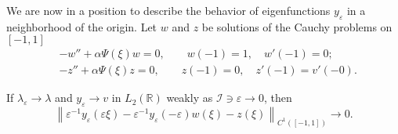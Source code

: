 \documentclass[11pt,english]{amsart}
\begin{document}
We are now in a position to describe the behavior of  eigenfunctions $y_\varepsilon$ in a neighborhood of the origin. Let $w$ and $z$ be solutions of the Cauchy problems on $[-1,1]$
\begin{align}\label{CauchyProblemW}
   & -w''+\alpha\Psi(\xi) w=0,\qquad w(-1)=1, \quad  w'(-1)=0;\\ \label{CauchyProblemZ}
   & -z''+\alpha\Psi(\xi) z=0,\qquad     z(-1)=0,\quad     z'(-1)=v'(-0).
\end{align}

\begin{g_lemma}\label{LemmaLocalConvergence} If $\lambda_\varepsilon\to \lambda$ and $y_\varepsilon \to v$ in $L_2(\mathbb{R})$ weakly as $\mathcal{I}\ni \varepsilon\to 0$, then
  \begin{equation}\label{YeWZ}
  \left\|\varepsilon^{-1}y_\varepsilon(\varepsilon\xi)-\varepsilon^{-1}y_\varepsilon(-\varepsilon)w(\xi)- z(\xi)\right\|_{C^1([-1,1])}\to 0.
  \end{equation}
\end{g_lemma}
\end{document}
